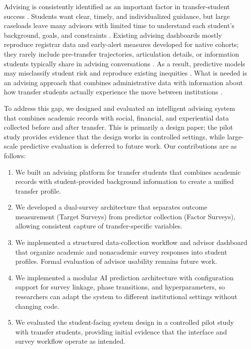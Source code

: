 \documentclass[letterpaper,11pt]{article}
\begin{document}
Advising is consistently identified as an important factor in transfer-student success \parencite{thiry2023,lukszo2020}. Students want clear, timely, and individualized guidance, but large caseloads leave many advisors with limited time to understand each student's background, goals, and constraints \parencite{preposttransfer2014,nguyen2025school}. Existing advising dashboards mostly reproduce registrar data and early-alert measures developed for native cohorts; they rarely include pre-transfer trajectories, articulation details, or information students typically share in advising conversations \parencite{nguyen2024community,nguyen2025school}. As a result, predictive models may misclassify student risk and reproduce existing inequities \parencite{computingtransfer2024,socialcognitive2022}. What is needed is an advising approach that combines administrative data with information about how transfer students actually experience the move between institutions \parencite{nguyen2025school}.

To address this gap, we designed and evaluated an intelligent advising system that combines academic records with social, financial, and experiential data collected before and after transfer. This is primarily a design paper; the pilot study provides evidence that the design works in controlled settings, while large-scale predictive evaluation is deferred to future work. Our contributions are as follows:

\begin{enumerate}
    \item We built an advising platform for transfer students that combines academic records with student-provided background information to create a unified transfer profile.
    \item We developed a dual-survey architecture that separates outcome measurement (Target Surveys) from predictor collection (Factor Surveys), allowing consistent capture of transfer-specific variables.
    \item We implemented a structured data-collection workflow and advisor dashboard that organize academic and nonacademic survey responses into student profiles. Formal evaluation of advisor usability remains future work.
    \item We implemented a modular AI prediction architecture with configuration support for survey linkage, phase transitions, and hyperparameters, so researchers can adapt the system to different institutional settings without changing code.
    \item We evaluated the student-facing system design in a controlled pilot study with transfer students, providing initial evidence that the interface and survey workflow operate as intended.
\end{enumerate}
\end{document}
